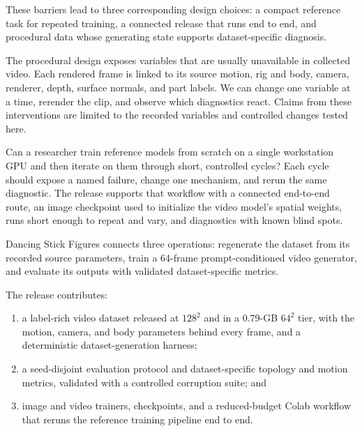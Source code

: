 \documentclass[10pt,twocolumn,letterpaper]{article}
\begin{document}
These barriers lead to three corresponding design choices: a compact reference task for repeated training, a
connected release that runs end to end, and procedural data whose generating state supports
dataset-specific diagnosis.

The procedural design exposes variables that are usually unavailable in collected video. Each rendered frame
is linked to its source motion, rig and body, camera, renderer, depth, surface normals, and part labels. We
can change one variable at a time, rerender the clip, and observe which diagnostics react. Claims from
these interventions are limited to the recorded variables and controlled changes tested here.

Can a researcher train reference models from scratch on a single workstation GPU and then iterate on them through
short, controlled cycles? Each cycle should expose a named failure, change one mechanism, and rerun the
same diagnostic. The release supports that workflow with a connected end-to-end route, an image checkpoint
used to initialize the video model's spatial weights, runs short enough to repeat and vary, and diagnostics
with known blind spots.

Dancing Stick Figures connects three operations: regenerate the dataset from its recorded source parameters,
train a 64-frame prompt-conditioned video generator, and evaluate its outputs with validated dataset-specific
metrics.

The release contributes:
\begin{enumerate}
\item a label-rich video dataset released at $128^2$ and in a 0.79-GB $64^2$ tier, with the motion, camera,
and body parameters behind every frame, and a deterministic dataset-generation harness;
\item a seed-disjoint evaluation protocol and dataset-specific topology and motion metrics, validated with a
controlled corruption suite; and
\item image and video trainers, checkpoints, and a reduced-budget Colab workflow that reruns the reference
training pipeline end to end.
\end{enumerate}
\end{document}
